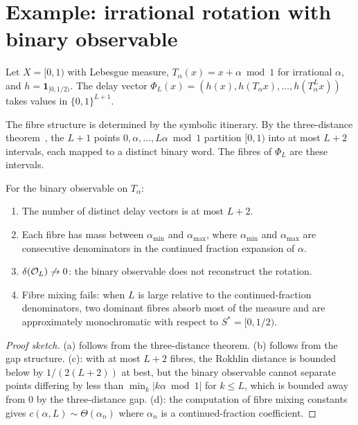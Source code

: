 \section{Example: irrational rotation with binary observable}
\label{sec:rotation}

Let $X = [0, 1)$ with Lebesgue measure, $T_\alpha(x) = x + \alpha
\bmod 1$ for irrational $\alpha$, and $h = \mathbf{1}_{[0, 1/2)}$.
The delay vector $\Phi_L(x) = (h(x), h(T_\alpha x), \ldots,
h(T_\alpha^L x))$ takes values in $\{0, 1\}^{L+1}$.

The fibre structure is determined by the symbolic itinerary.
By the three-distance theorem~\cite{Steinhaus1957, Sos1958},
the $L+1$ points $0, \alpha, \ldots, L\alpha \bmod 1$ partition
$[0, 1)$ into at most $L + 2$ intervals, each mapped to a distinct
binary word.  The fibres of $\Phi_L$ are these intervals.

\begin{proposition}
\label{prop:rotation}
For the binary observable on $T_\alpha$:
\begin{enumerate}[label=(\alph*)]
  \item The number of distinct delay vectors is at most $L + 2$.
  \item Each fibre has mass between $\alpha_{\min}$ and
    $\alpha_{\max}$, where $\alpha_{\min}$ and $\alpha_{\max}$
    are consecutive denominators in the continued fraction
    expansion of $\alpha$.
  \item $\delta(\mathcal{O}_L) \not\to 0$: the binary observable does
    not reconstruct the rotation.
  \item Fibre mixing fails: when $L$ is large relative to the
    continued-fraction denominators, two dominant fibres absorb
    most of the measure and are approximately monochromatic with
    respect to $S^* = [0, 1/2)$.
\end{enumerate}
\end{proposition}

\begin{proof}[Proof sketch]
(a) follows from the three-distance theorem.  (b) follows from
the gap structure.  (c): with at most $L + 2$ fibres, the Rokhlin
distance is bounded below by $1/(2(L + 2))$ at best, but the
binary observable cannot separate points differing by less than
$\min_k |k\alpha \bmod 1|$ for $k \leq L$, which is bounded
away from 0 by the three-distance gap.  (d): the computation of
fibre mixing constants gives
$c(\alpha, L) \sim \Theta(\alpha_n)$ where $\alpha_n$ is a
continued-fraction coefficient.
\end{proof}

